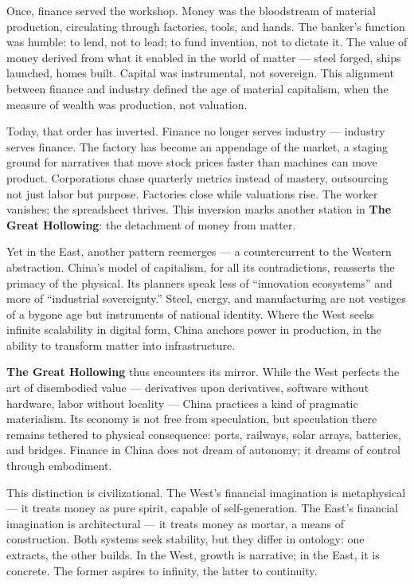 \documentclass[11pt,twoside]{book}
\begin{document}
Once, finance served the workshop.  
Money was the bloodstream of material production, circulating through factories, tools, and hands.  The banker’s function was humble: to lend, not to lead; to fund invention, not to dictate it.  The value of money derived from what it enabled in the world of matter — steel forged, ships launched, homes built.  Capital was instrumental, not sovereign.  This alignment between finance and industry defined the age of material capitalism, when the measure of wealth was production, not valuation.

Today, that order has inverted.  Finance no longer serves industry — industry serves finance.  The factory has become an appendage of the market, a staging ground for narratives that move stock prices faster than machines can move product.  Corporations chase quarterly metrics instead of mastery, outsourcing not just labor but purpose.  Factories close while valuations rise.  The worker vanishes; the spreadsheet thrives.  This inversion marks another station in \textbf{The Great Hollowing}: the detachment of money from matter.

Yet in the East, another pattern reemerges — a countercurrent to the Western abstraction.  China’s model of capitalism, for all its contradictions, reasserts the primacy of the physical.  Its planners speak less of “innovation ecosystems” and more of “industrial sovereignty.”  Steel, energy, and manufacturing are not vestiges of a bygone age but instruments of national identity.  Where the West seeks infinite scalability in digital form, China anchors power in production, in the ability to transform matter into infrastructure.

\textbf{The Great Hollowing} thus encounters its mirror.  While the West perfects the art of disembodied value — derivatives upon derivatives, software without hardware, labor without locality — China practices a kind of pragmatic materialism.  Its economy is not free from speculation, but speculation there remains tethered to physical consequence: ports, railways, solar arrays, batteries, and bridges.  Finance in China does not dream of autonomy; it dreams of control through embodiment.

This distinction is civilizational.  The West’s financial imagination is metaphysical — it treats money as pure spirit, capable of self-generation.  The East’s financial imagination is architectural — it treats money as mortar, a means of construction.  Both systems seek stability, but they differ in ontology: one extracts, the other builds.  In the West, growth is narrative; in the East, it is concrete.  The former aspires to infinity, the latter to continuity.
\end{document}
